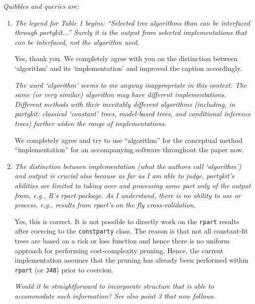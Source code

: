 \documentclass{article}
\begin{document}
\textit{Quibbles and queries are:}
\begin{enumerate}
\item 
\textit{%
The legend for Table 1 begins: ``Selected tree algorithms than can be
interfaced through partykit...''  Surely it is the output from selected
implementations that can be interfaced, not the algorithm used.
}

\smallskip

Yes, thank you. We completely agree with you on the distinction between
`algorithm' and its `implementation' and improved the caption accordingly.

\medskip

\textit{%
The word `algorithm' seems to me anyway inappropriate in this context. The
same (or very similar) algorithm may have different implementations.  Different
methods with their inevitably different algorithms (including, in partykit:
classical `constant' trees, model-based trees, and conditional inference
trees) further widen the range of implementations.
}

\smallskip

We completely agree and try to use ``algorithm'' for the conceptual method
``implementation'' for an accompanying software throughout the paper now.

\item 
\textit{%
The distinction between implementation (what the authors call `algorithm')
and output is crucial also because as far as I am able to judge, partykit's
abilities are limited to taking over and processing some part only of the
output from, e.g., R's rpart package.  As I understand, there is no ability
to use or process, e.g., results from rpart's on the fly cross-validation.
}

\smallskip

Yes, this is correct. It is not possible to directly work on the \texttt{rpart}
results after coercing to the \texttt{constparty} class.  The reason is that not
all constant-fit trees are based on a risk or loss function and hence there
is no uniform approach for performing cost-complexity pruning.
Hence, the current implementation assumes that the pruning has already been
performed within \texttt{rpart} (or \texttt{J48}) prior to coercion.

\medskip

\textit{%
Would it be straightforward to incorporate structure that is able to
accommodate such information?  See also point 3 that now follows.
}

\smallskip


\end{enumerate}
\end{document}
